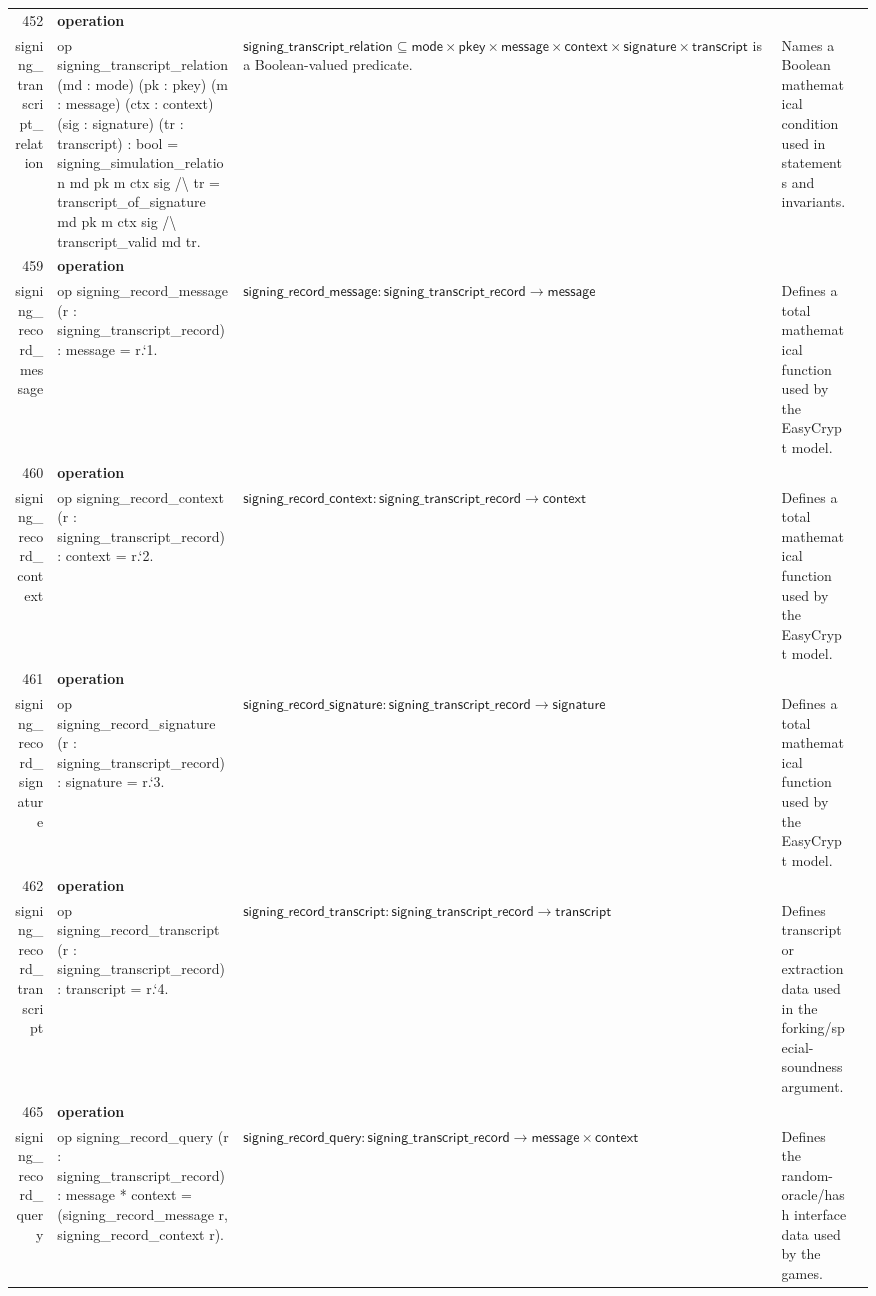 \documentclass[10pt]{article}
\newcommand{\ec}[1]{\begingroup\ttfamily\scriptsize #1\endgroup}
\begin{document}
\begin{longtable}{r L{0.17\textwidth} L{0.26\textwidth} L{0.27\textwidth} L{0.20\textwidth}}
452 & \textbf{operation}\\\ec{signing\_transcript\_relation} & \ec{op signing\_transcript\_relation (md : mode) (pk : pkey) (m : message) (ctx : context) (sig : signature) (tr : transcript) : bool = signing\_simulation\_relation md pk m ctx sig /\textbackslash{} tr = transcript\_of\_signature md pk m ctx sig /\textbackslash{} transcript\_valid md tr.} & \(\mathsf{signing\_transcript\_relation} \subseteq \mathsf{mode} \times \mathsf{pkey} \times \mathsf{message} \times \mathsf{context} \times \mathsf{signature} \times \mathsf{transcript}\) is a Boolean-valued predicate. & Names a Boolean mathematical condition used in statements and invariants. \\
459 & \textbf{operation}\\\ec{signing\_record\_message} & \ec{op signing\_record\_message (r : signing\_transcript\_record) : message = r.`1.} & \(\mathsf{signing\_record\_message} : \mathsf{signing\_transcript\_record} \to \mathsf{message}\) & Defines a total mathematical function used by the EasyCrypt model. \\
460 & \textbf{operation}\\\ec{signing\_record\_context} & \ec{op signing\_record\_context (r : signing\_transcript\_record) : context = r.`2.} & \(\mathsf{signing\_record\_context} : \mathsf{signing\_transcript\_record} \to \mathsf{context}\) & Defines a total mathematical function used by the EasyCrypt model. \\
461 & \textbf{operation}\\\ec{signing\_record\_signature} & \ec{op signing\_record\_signature (r : signing\_transcript\_record) : signature = r.`3.} & \(\mathsf{signing\_record\_signature} : \mathsf{signing\_transcript\_record} \to \mathsf{signature}\) & Defines a total mathematical function used by the EasyCrypt model. \\
462 & \textbf{operation}\\\ec{signing\_record\_transcript} & \ec{op signing\_record\_transcript (r : signing\_transcript\_record) : transcript = r.`4.} & \(\mathsf{signing\_record\_transcript} : \mathsf{signing\_transcript\_record} \to \mathsf{transcript}\) & Defines transcript or extraction data used in the forking/special-soundness argument. \\
465 & \textbf{operation}\\\ec{signing\_record\_query} & \ec{op signing\_record\_query (r : signing\_transcript\_record) : message * context = (signing\_record\_message r, signing\_record\_context r).} & \(\mathsf{signing\_record\_query} : \mathsf{signing\_transcript\_record} \to \mathsf{message} \times \mathsf{context}\) & Defines the random-oracle/hash interface data used by the games. \\

\end{longtable}
\end{document}
